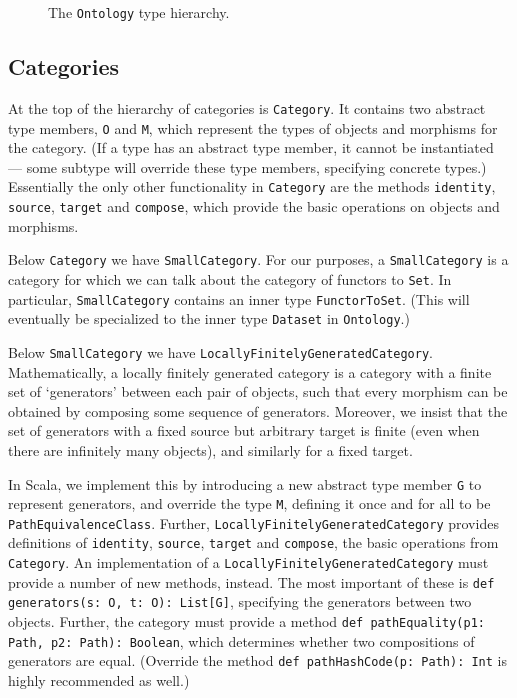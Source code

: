 \documentclass{amsart}
\newcommand{\type}[1]{{\tt #1}}
\newcommand{\code}[1]{{\tt #1}}
\begin{document}
\begin{figure}[ht]
\caption{The \type{Ontology} type hierarchy.}
\label{fig:ontology-hierarchy}
\end{figure}

\subsection{Categories}
At the top of the hierarchy of categories is \type{Category}. It contains two abstract type members, \code{O} and \code{M}, which represent the types of objects and morphisms for the category. (If a type has an abstract type member, it cannot be instantiated --- some subtype will override these type members, specifying concrete types.) Essentially the only other functionality in \type{Category} are the methods \code{identity}, \code{source}, \code{target} and \code{compose}, which provide the basic operations on objects and morphisms.

Below \type{Category} we have \type{SmallCategory}. For our purposes, a \type{SmallCategory} is a category for which we can talk about the category of functors to \type{Set}. In particular, \type{SmallCategory} contains an inner type \type{FunctorToSet}. (This will eventually be specialized to the inner type \type{Dataset} in \type{Ontology}.)

Below \type{SmallCategory} we have \type{LocallyFinitelyGeneratedCategory}. Mathematically, a locally finitely generated category is a category with a finite set of `generators' between each pair of objects, such that every morphism can be obtained by composing some sequence of generators. Moreover, we insist that the set of generators with a fixed source but arbitrary target is finite (even when there are infinitely many objects), and similarly for a fixed target.

In Scala, we implement this by introducing a new abstract type member \code{G} to represent generators, and override the type \code{M}, defining it once and for all to be \code{PathEquivalenceClass}. Further, \type{LocallyFinitelyGeneratedCategory} provides definitions of \code{identity}, \code{source}, \code{target} and \code{compose}, the basic operations from \type{Category}. An implementation of a \type{LocallyFinitelyGeneratedCategory} must provide a number of new methods, instead. The most important of these is \code{def generators(s: O, t: O): List[G]}, specifying the generators between two objects. Further, the category must provide a method \code{def pathEquality(p1: Path, p2: Path): Boolean}, which determines whether two compositions of generators are equal. (Override the method \code{def pathHashCode(p: Path): Int} is highly recommended as well.)
\end{document}
